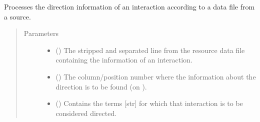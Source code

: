 \documentclass[letterpaper,10pt,english]{sphinxmanual}
\begin{document}
\begin{fulllineitems}
\begin{fulllineitems}
\label{\detokenize{reference:pypath.main.PyPath.phosphosite_directions}}
\end{fulllineitems}


\begin{fulllineitems}
\label{\detokenize{reference:pypath.main.PyPath.prdb_tissue_expr}}
\end{fulllineitems}


\begin{fulllineitems}
\label{\detokenize{reference:pypath.main.PyPath.process_direction}}
Processes the direction information of an interaction according
to a data file from a source.
\begin{quote}\begin{description}
\item[{Parameters}] \leavevmode\begin{itemize}
\item {} 
 () \textendash{} The stripped and separated line from the resource data file
containing the information of an interaction.

\item {} 
 () \textendash{} The column/position number where the information about the
direction is to be found (on ).

\item {} 
 () \textendash{} Contains the terms {[}str{]} for which that interaction is to be
considered directed.


\end{itemize}
\end{description}
\end{quote}
\end{fulllineitems}
\end{fulllineitems}
\end{document}
